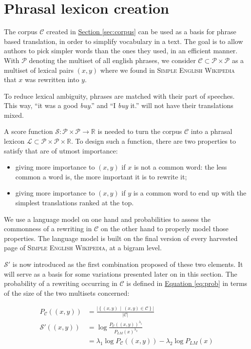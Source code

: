 \documentclass[a4paper, 11pt, onepage]{scrreprt}
\newcommand\sew{\textsc{Simple English Wikipedia}}
\newcommand\sectionref[1]{\hyperref[#1]{Section \ref*{#1}}}
\newcommand\equaref[1]{\hyperref[#1]{Equation \ref*{#1}}}
\newcommand\card[1]{\lvert #1 \rvert}
\newcommand\suchthat{\, \middle| \,}
\newcommand\proba[2][]{P_{#1} \left( #2 \right)}
\begin{document}
\section{Phrasal lexicon creation}
\label{sec:lexical-enhancements}

The corpus $\mathcal{C}$ created in \sectionref{sec:corpus} can be
used as a basis for phrase based translation, in order to simplify
vocabulary in a text. The goal is to allow authors to pick simpler
words than the ones they used, in an efficient manner. With
$\mathcal{P}$ denoting the multiset of all english phrases, we
consider $\mathcal{C} \subset \mathcal{P} \times \mathcal{P}$ as a
multiset of lexical pairs $(x, y)$ where we found in \sew{} that $x$
was rewritten into $y$.

To reduce lexical ambiguity, phrases are matched with their part of
speeches. This way, “it was a good \emph{buy}.” and “I \emph{buy} it.”
will not have their translations mixed.

A score function $\mathcal{S} : \mathcal{P} \times \mathcal{P}
\rightarrow \mathbb{R}$ is needed to turn the corpus $\mathcal{C}$
into a phrasal lexicon $\mathcal{L} \subset \mathcal{P} \times
\mathcal{P} \times \mathbb{R}$. To design such a function, there are
two properties to satisfy that are of utmost importance:

\begin{itemize}
\item giving more importance to $(x, y)$ if $x$ is not a common word:
  the less common a word is, the more important it is to rewrite it;
\item giving more importance to $(x, y)$ if $y$ is a common word to
  end up with the simplest translations ranked at the top.
\end{itemize}

We use a language model on one hand and probabilities to assess the
commonness of a rewriting in $\mathcal{C}$ on the other hand to
properly model those properties. The language model is built on the
final version of every harvested page of \sew, at a bigram level.

$\mathcal{S'}$ is now introduced as the first combination proposed of
these two elements. It will serve as a basis for some variations
presented later on in this section. The probability of a rewriting
occurring in $\mathcal{C}$ is defined in \equaref{eq:prob} in terms of
the size of the two multisets concerned:

\begin{align}
  \label{eq:prob}
  \proba[\mathcal{C}]{(x, y)} & = \frac{\card{\left\{(x, y) \suchthat
        (x, y) \in \mathcal{C}\right\}}}{\card{\mathcal{C}}} \\
  \label{eq:s'1}
  \mathcal{S'}((x, y)) & = \log \frac{\proba[\mathcal{C}]{(x, y)}^{\lambda_1}}%
  {\proba[LM]{x}^{\lambda_2}} \\
  \label{eq:s'2}
  & = \lambda_1 \log \proba[\mathcal{C}]{(x, y)} - \lambda_2 \log \proba[LM]{x}
\end{align}
\end{document}
